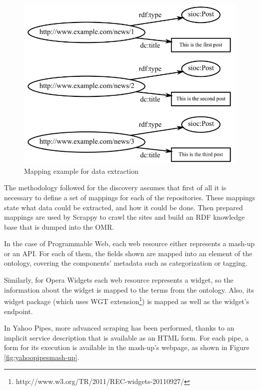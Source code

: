 \begin{figure}[ht!]
\centering
\includegraphics[width=350pt]{graphics/graph2.png}
\caption{Mapping example for data extraction}
\label{fig:mappingexample2}
\end{figure}


The methodology followed for the discovery assumes that first of all it is necessary to define a set of mappings for each of the repositories. These mappings state what data could be extracted, and how it could be done. Then prepared mappings are used by Scrappy to crawl the sites and build an RDF knowledge base that is dumped into the OMR.

In the case of Programmable Web, each web resource either represents a mash-up or an API. For each of them, the fields shown are mapped into an element of the ontology, covering the components' metadata such as categorization or tagging.

Similarly, for Opera Widgets each web resource represents a widget, so the information about the widget is mapped to the terms from the ontology. Also, its widget package (which uses WGT extension\footnote{http://www.w3.org/TR/2011/REC-widgets-20110927/}) is mapped as well as the widget's endpoint.

In Yahoo Pipes, more advanced scraping has been performed, thanks to an implicit service description that is available as an HTML form. For each pipe, a form for its execution is available in the mash-up's webpage, as shown in Figure \ref{fig:yahoopipesmash-up}.

